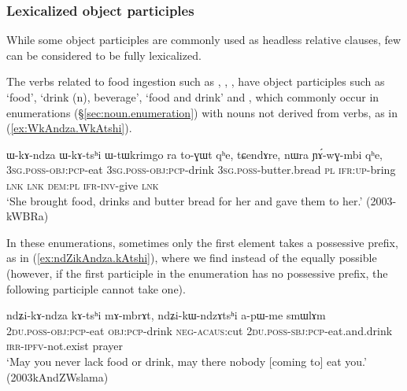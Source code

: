 \subsubsection{Lexicalized object participles} \label{sec:lexicalized.object.participle}
While some object participles are commonly used as headless relative clauses, few can be considered to be fully lexicalized. 

The verbs related to food ingestion such as , , ,  have object participles such as  `food',  `drink (n), beverage',  `food and drink' and , which commonly occur in enumerations (§\ref{sec:noun.enumeration}) with nouns not derived from verbs, as in (\ref{ex:WkAndza.WkAtshi}).  

\begin{exe}
\ex \label{ex:WkAndza.WkAtshi}
\gll  ɯ-kɤ-ndza ɯ-kɤ-tsʰi ɯ-tɯkrimgo ra to-ɣɯt qʰe, tɕendɤre, nɯra ɲɤ́-wɣ-mbi qʰe, \\
\textsc{3sg}.\textsc{poss}-\textsc{obj}:\textsc{pcp}-eat \textsc{3sg}.\textsc{poss}-\textsc{obj}:\textsc{pcp}-drink \textsc{3sg}.\textsc{poss}-butter.bread \textsc{pl} \textsc{ifr}:\textsc{up}-bring \textsc{lnk} \textsc{lnk} \textsc{dem}:\textsc{pl} \textsc{ifr}-\textsc{inv}-give \textsc{lnk} \\
 \glt  `She brought food, drinks and butter bread for her and gave them to her.' (2003-kWBRa)
\end{exe}

In these enumerations, sometimes only the first element takes a possessive prefix, as in (\ref{ex:ndZikAndza.kAtshi}), where we find  instead of the equally possible  (however, if the first  participle in the enumeration has no possessive prefix, the following participle cannot take one).

\begin{exe}
\ex \label{ex:ndZikAndza.kAtshi}
\gll  ndʑi-kɤ-ndza kɤ-tsʰi mɤ-mbrɤt, ndʑi-kɯ-ndzɤtsʰi a-pɯ-me smɯlɤm \\
\textsc{2du}.\textsc{poss}-\textsc{obj}:\textsc{pcp}-eat \textsc{obj}:\textsc{pcp}-drink \textsc{neg}-\textsc{acaus}:cut  \textsc{2du}.\textsc{poss}-\textsc{sbj}:\textsc{pcp}-eat.and.drink \textsc{irr}-\textsc{ipfv}-not.exist prayer \\
\glt `May you never lack food or drink, may there nobody [coming to] eat you.' (2003kAndZWslama)
\end{exe}

